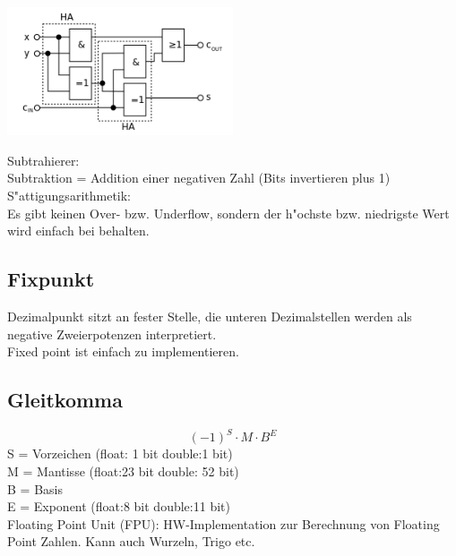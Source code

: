 \begin{flushleft}
{\includegraphics[width=0.5\textwidth]{images/Arithmetik/volladdierer.png}}
\label{Fig: Volladdierer}
\end{flushleft}

Subtrahierer:\\
Subtraktion = Addition einer negativen Zahl (Bits invertieren plus 1)\\

S"attigungsarithmetik:\\
Es gibt keinen Over- bzw. Underflow, sondern der h"ochste bzw. niedrigste Wert wird einfach bei behalten.\\
\subsection{Fixpunkt}
Dezimalpunkt sitzt an fester Stelle, die unteren Dezimalstellen werden als negative Zweierpotenzen interpretiert. \\
Fixed point ist einfach zu implementieren. 
\subsection{Gleitkomma}
\begin{equation}
(-1)^S\cdot M \cdot B^E
\end{equation}
S = Vorzeichen (float: 1 bit double:1 bit)\\
M = Mantisse (float:23 bit double: 52 bit)\\
B = Basis \\
E = Exponent (float:8 bit double:11 bit)\\

Floating Point Unit (FPU): HW-Implementation zur Berechnung von Floating Point Zahlen. Kann auch Wurzeln, Trigo etc.\\

